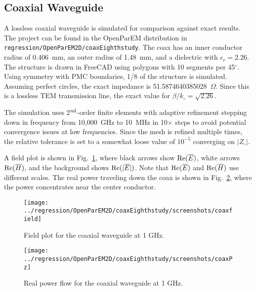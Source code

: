 \documentclass[titlepage]{article}
\renewcommand\_{\textunderscore\linebreak[1]}
\begin{document}
\subsection{Coaxial Waveguide}

A lossless coaxial waveguide is simulated for comparison against exact results.  The project can be found in the OpenParEM distribution in \texttt{regression/OpenParEM2D/coaxEighth\_study}.  The coax has an inner conductor radius of 0.406~mm, an outer radius of 1.48~mm, and a dielectric with $\epsilon_r=2.26$.  The structure is drawn in FreeCAD\cite{FreeCAD} using polygons with 10 segments per 45$^{\circ}$. Using symmetry with PMC boundaries, 1/8 of the structure is simulated.  Assuming perfect circles, the exact impedance is 51.5874640385028~$\Omega$.  Since this is a lossless TEM transmission line, the exact value for $\beta/k_{\circ}=\sqrt{2.26}$.

The simulation uses 2$^{\textnormal{nd}}$-order finite elements with adaptive refinement stepping down in frequency from 10,000~GHz to 10~MHz in 10$\times$ steps to avoid potential convergence issues at low frequencies.  Since the mesh is refined multiple times, the relative tolerance is set to a somewhat loose value of $10^{-5}$ converging on $|Z_{\circ}|$.

A field plot is shown in Fig.~\ref{fig:coax_field}, where black arrows show $\textnormal{Re}(\overline{E})$, white arrows $\textnormal{Re}(\overline{H})$, and the background shows $\textnormal{Re}(|\overline{E}|)$.  Note that $\textnormal{Re}(\overline{E})$ and $\textnormal{Re}(\overline{H})$ use different scales. The real power traveling down the coax is shown in Fig.~\ref{fig:coax_Pz}, where the power concentrates near the center conductor.

\begin{figure}[H]
  \centering
  \texttt{[image: ../regression/OpenParEM2D/coaxEighth\_study/screenshots/coax\_field]}
  \caption{Field plot for the coaxial waveguide at 1 GHz.}
  \label{fig:coax_field}
\end{figure}

\begin{figure}[H]
  \centering
  \texttt{[image: ../regression/OpenParEM2D/coaxEighth\_study/screenshots/coax\_Pz]}
  \caption{Real power flow for the coaxial waveguide at 1 GHz.}
  \label{fig:coax_Pz}
\end{figure}
\end{document}
